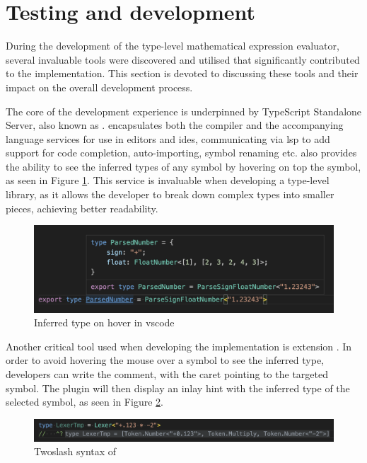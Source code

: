 \section{Testing and development}

During the development of the type-level mathematical expression evaluator, several invaluable tools were discovered and utilised that significantly contributed to the implementation. This section is devoted to discussing these tools and their impact on the overall development process.

The core of the development experience is underpinned by TypeScript Standalone Server, also known as .  encapsulates both the compiler and the accompanying language services for use in editors and \acrshort{ide}s, communicating via \acrshort{lsp} to add support for code completion, auto-importing, symbol renaming etc.  also provides the ability to see the inferred types of any symbol by hovering on top the symbol, as seen in Figure \ref{fig:tsserver-hover}. This service is invaluable when developing a type-level library, as it allows the developer to break down complex types into smaller pieces, achieving better readability.

\begin{figure}[ht]
  \centering
  \includegraphics[width=\textwidth]{text/testing/tsserver-hover.png}
  \caption{Inferred type on hover in \acrshort{vscode}}
  \label{fig:tsserver-hover}
\end{figure}

Another critical tool used when developing the implementation is  extension \cite{theroxVscodetwoslashqueries2023}. In order to avoid hovering the mouse over a symbol to see the inferred type, developers can write the  comment, with the caret pointing to the targeted symbol. The plugin will then display an inlay hint with the inferred type of the selected symbol, as seen in Figure \ref{fig:twoslash-plugin}.

\begin{figure}[ht]
  \centering
  \includegraphics[width=\textwidth]{text/testing/vscode-twoslash-plugin.png}
  \caption{Twoslash syntax of }
  \label{fig:twoslash-plugin}
\end{figure}

